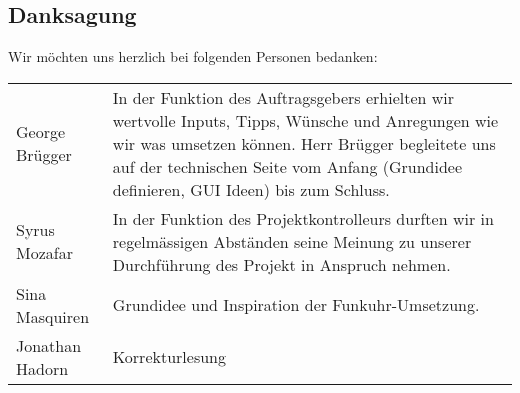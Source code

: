 


\subsection{Danksagung}
Wir möchten uns herzlich bei folgenden Personen bedanken:\\
\vspace{0.5cm}

\begin{tabular}{p{3cm} p{10cm}}
George Brügger & In der Funktion des Auftragsgebers erhielten wir wertvolle Inputs, Tipps, Wünsche und Anregungen wie wir was umsetzen können. Herr Brügger begleitete uns auf der technischen Seite vom Anfang (Grundidee definieren, GUI Ideen) bis zum Schluss.\\
Syrus Mozafar & In der Funktion des Projektkontrolleurs durften wir in regelmässigen Abständen seine Meinung zu unserer Durchführung des Projekt in Anspruch nehmen.\\
Sina Masquiren & Grundidee und Inspiration der Funkuhr-Umsetzung.\\
Jonathan Hadorn & Korrekturlesung\\
\end{tabular}
